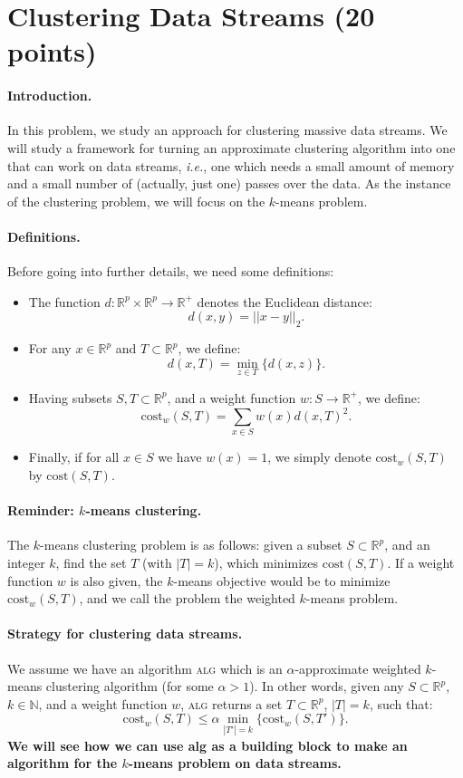 \section{Clustering Data Streams (20 points) }

\paragraph{Introduction.}
In this problem, we study an approach for clustering massive data streams. We will study a framework for turning an approximate clustering algorithm into one that can work on data streams, \emph{i.e.}, one which needs a small amount of memory and a small number of (actually, just one) passes over the data. As the instance of the clustering problem, we will focus on the $k$-means problem.

\paragraph{Definitions.}
Before going into further details, we need some definitions:
\begin{itemize}
	\item The function $d:\mathbb{R}^{p}\times \mathbb{R}^{p} \rightarrow \mathbb{R}^{+}$ denotes the Euclidean distance:
	\[
		d(x,y) = ||x-y||_2.
	\]
	\item For any $x\in \mathbb{R}^p$ and $T\subset \mathbb{R}^p$, we define:
	\[
		d(x,T)=\min_{z\in T}\{d(x,z)\}.
	\]
	\item Having subsets $S,T\subset \mathbb{R}^{p}$, and a weight function $w:S\rightarrow \mathbb{R}^{+}$, we define:
	\[
		\mathrm{cost}_w(S,T)=\sum_{x\in S} w(x)d(x,T)^2.
	\]
	\item Finally, if for all $x\in S$ we have $w(x)=1$, we simply denote $\mathrm{cost}_w(S,T)$ by $\mathrm{cost}(S,T)$.
\end{itemize}

\paragraph{Reminder: $k$-means clustering.}
The $k$-means clustering problem is as follows: given a subset $S\subset \mathbb{R}^p$, and an integer $k$, find the set $T$ (with $|T|=k$), which minimizes $\mathrm{cost}(S,T)$. If a weight function $w$ is also given, the $k$-means objective would be to minimize $\mathrm{cost}_w(S,T)$, and we call the problem the weighted $k$-means problem.

\paragraph{Strategy for clustering data streams.}
We assume we have an algorithm \textsc{alg} which is an $\alpha$-approximate weighted $k$-means clustering algorithm (for some $\alpha>1$). In other words, given any $S\subset \mathbb{R}^p$, $k\in\mathbb{N}$, and a weight function $w$, \textsc{alg} returns a set $T\subset
\mathbb{R}^p$, $|T|=k$, such that:
\[
	\mathrm{cost}_w(S,T)\leq \alpha \min_{|T'|=k}\{\mathrm{cost}_w(S,T')\}.
\]
\textbf{We will see how we can use {\sc alg} as a building block to make an algorithm for the $k$-means problem on data streams.}


